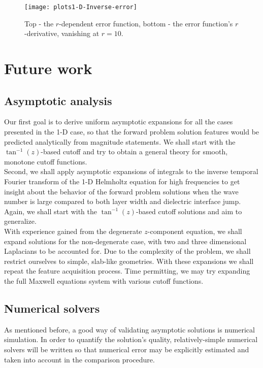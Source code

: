 \documentclass[12pt,twoside]{report}
\begin{document}
\begin{figure}[!htb] 
\begin{center}
\texttt{[image: plots1-D-Inverse-error]}
\end{center}
\caption{Top - the $r$-dependent error function, bottom - the error function's $r$-derivative, vanishing at $r=10$.}


\label{fig:inverseR-1-D-err-and-analytic-dErr}
\end{figure}

\chapter{Future work}
\section{Asymptotic analysis}
Our first goal is to derive uniform asymptotic expansions for all the cases presented in the 1-D case, so that the forward problem solution features would be predicted analytically from magnitude statements. We shall start with the $\tan^{-1}(z)$-based cutoff and try to obtain a general theory for smooth, monotone cutoff functions.  \\
Second, we shall apply asymptotic expansions of integrals to the inverse temporal Fourier transform of the 1-D Helmholtz equation for high frequencies to get insight about the behavior of the forward problem solutions when the wave number is large compared to both layer width and dielectric interface jump. Again, we shall start with the $\tan^{-1}(z)$-based cutoff solutions  and aim to generalize. \\
With experience gained from the degenerate $z$-component equation, we shall expand solutions for the non-degenerate case, with two and three dimensional Laplacians to be accounted for. Due to the complexity of the problem, we shall restrict ourselves to simple, slab-like geometries. With these expansions we shall repeat the feature acquisition process. Time permitting, we may try expanding the full Maxwell equations system with various cutoff functions.

\section{Numerical solvers}
As mentioned before, a good way of validating asymptotic solutions is numerical simulation. In order to quantify the solution's quality, relatively-simple numerical solvers will be written so that numerical error may be explicitly estimated and taken into account in the comparison procedure.
\end{document}
